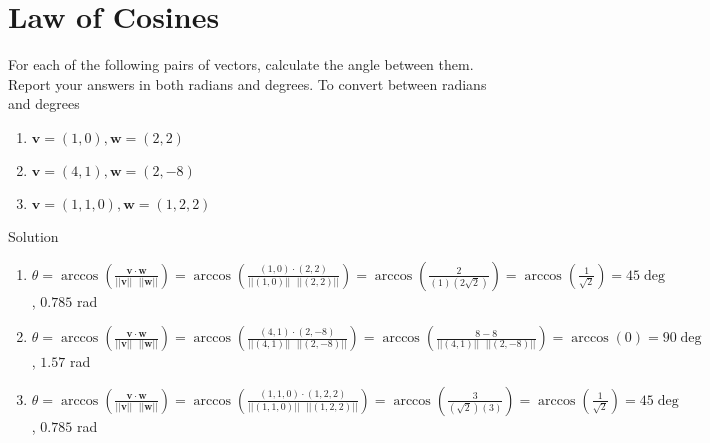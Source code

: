 \documentclass[12pt]{article}
\begin{document}
\section{Law of Cosines}
For each of the following pairs of vectors, calculate the angle between them. Report your answers in both
radians and degrees. To convert between radians and degrees
\begin{enumerate}
    \item $\mathbf{v} = (1,0), \mathbf{w} = (2,2)$
    \item $\mathbf{v} = (4,1), \mathbf{w} = (2,-8)$
    \item $\mathbf{v} = (1,1,0), \mathbf{w} = (1,2,2)$
\end{enumerate}
Solution
\begin{enumerate}
    \item $\theta = \arccos\left(\frac{\mathbf{v}\cdot \mathbf{w}}{||\mathbf{v}||  \text{ }||\mathbf{w}||}\right) 
    = \arccos\left(\frac{(1,0)\cdot (2,2)}{||(1,0)|| \text{ }  ||(2,2)||}\right) 
    = \arccos\left(\frac{2}{(1)(2\sqrt{2})}\right) = \arccos\left(\frac{1}{\sqrt{2}}\right) = 45\deg$, $0.785$ rad
    
    \item $\theta = \arccos\left(\frac{\mathbf{v}\cdot \mathbf{w}}{||\mathbf{v}||  \text{ }||\mathbf{w}||}\right) 
    = \arccos\left(\frac{(4,1)\cdot (2,-8)}{||(4,1)|| \text{ }  ||(2,-8)||}\right) 
    = \arccos\left(\frac{8-8}{||(4,1)|| \text{ }  ||(2,-8)||}\right) 
    =\arccos(0) = 90\deg$, $1.57$ rad
    
    \item $\theta = \arccos\left(\frac{\mathbf{v}\cdot \mathbf{w}}{||\mathbf{v}||  \text{ }||\mathbf{w}||}\right) 
    = \arccos\left(\frac{(1,1,0)\cdot (1,2,2)}{||(1,1,0)|| \text{ }  ||(1,2,2)||}\right) 
    = \arccos\left(\frac{3}{(\sqrt{2})(3)}\right) = \arccos\left(\frac{1}{\sqrt{2}}\right) = 45\deg$, $0.785$ rad
\end{enumerate}
\end{document}
